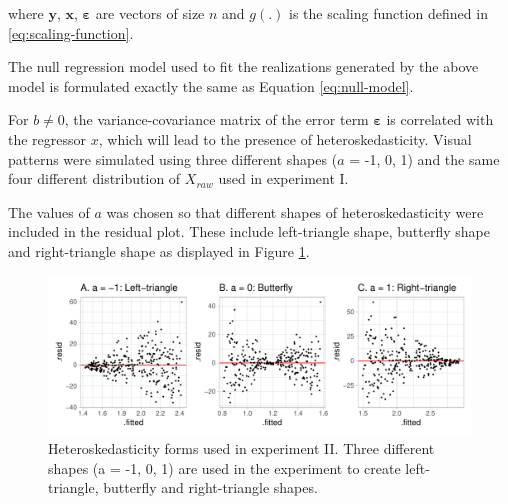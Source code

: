 \documentclass[]{interact}
\theoremstyle{plain}%
\theoremstyle{definition}
\theoremstyle{remark}
\begin{document}
where \(\boldsymbol{y}\), \(\boldsymbol{x}\),
\(\boldsymbol{\varepsilon}\) are vectors of size \(n\) and \(g(.)\) is
the scaling function defined in \ref{eq:scaling-function}.

The null regression model used to fit the realizations generated by the
above model is formulated exactly the same as Equation
\ref{eq:null-model}.

For \(b \neq 0\), the variance-covariance matrix of the error term
\(\boldsymbol{\varepsilon}\) is correlated with the regressor \(x\),
which will lead to the presence of heteroskedasticity. Visual patterns
were simulated using three different shapes (\(a\) = -1, 0, 1) and the
same four different distribution of \(X_{raw}\) used in experiment I.

The values of \(a\) was chosen so that different shapes of
heteroskedasticity were included in the residual plot. These include
left-triangle shape, butterfly shape and right-triangle shape as
displayed in Figure \ref{fig:different-shape-of-heter}.

\begin{figure}

{\centering \includegraphics[width=1\linewidth]{paper_comparison_files/figure-latex/different-shape-of-heter-1} 

}

\caption{Heteroskedasticity forms used in experiment II. Three different shapes (a = -1, 0, 1) are used in the experiment to create left-triangle, butterfly and right-triangle shapes.}\label{fig:different-shape-of-heter}
\end{figure}
\end{document}
